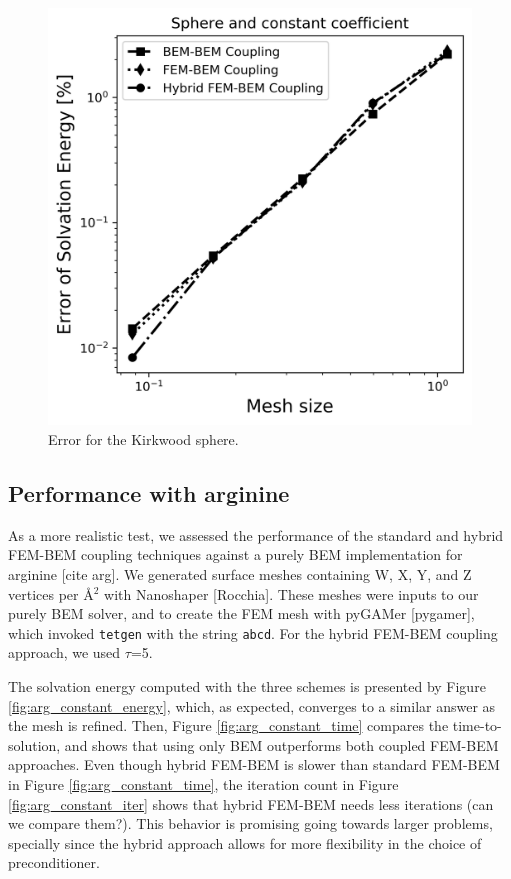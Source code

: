 \begin{figure}
  \centering
  \includegraphics[width=0.6\linewidth]{Sphere_const_coeff_error.png}
  \caption{Error for the Kirkwood sphere.}
  \label{fig:error_sphere}
\end{figure}

\subsection*{\sffamily \large Performance with arginine}

As a more realistic test, we assessed the performance of the standard and hybrid FEM-BEM coupling techniques against a purely BEM implementation for arginine [cite arg]. 
We generated surface meshes containing W, X, Y, and Z vertices per \AA$^2$ with Nanoshaper [Rocchia].
These meshes were inputs to our purely BEM solver, and to create the FEM mesh with pyGAMer [pygamer], which invoked \texttt{tetgen} with the string \texttt{abcd}.
For the hybrid FEM-BEM coupling approach, we used $\tau$=5.

The solvation energy computed with the three schemes is presented by Figure \ref{fig:arg_constant_energy}, which, as expected, converges to a similar answer as the mesh is refined.
Then, Figure \ref{fig:arg_constant_time} compares the time-to-solution, and shows that using only BEM outperforms both coupled FEM-BEM approaches.
Even though hybrid FEM-BEM is slower than standard FEM-BEM in Figure \ref{fig:arg_constant_time}, the iteration count in Figure \ref{fig:arg_constant_iter} shows that hybrid FEM-BEM needs less iterations (can we compare them?). 
This behavior is promising going towards larger problems, specially since the hybrid approach allows for more flexibility in the choice of preconditioner.

